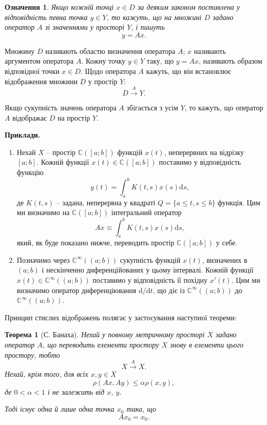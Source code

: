 \documentclass[14pt,twoside]{extreport}
\theoremstyle{mystyle}
\newtheorem{dfn}{Означення}
\newtheorem{thm}{Теорема}
\numberwithin{equation}{chapter}
\newcommand{\cab}{\mathbb{C}([a; b])}
\begin{document}
\begin{dfn}
 Якщо кожній точці $x\in D$ за деяким законом поставлена у відповідність певна точка $y\in Y$, то кажуть, що на множині $D$ задано оператор $A$ зі значеннями у просторі $Y$, і пишуть
 \[
  y=Ax.
 \]
\end{dfn}

Множину $D$ називають областю визначення оператора $A$; $x$ називають аргументом оператора $A$. Кожну точку $y \in Y$ таку, що $y = Ax$, називають образом відповідної точки $x\in D$. Щодо оператора $A$ кажуть, що він встановлює відображення множини $D$ у простір $Y$:
\[
 D\xrightarrow{A}Y.
\]

Якщо сукупність значень оператора $A$ збігається з усім $Y$, то кажуть, що оператор $A$ відображає $D$ на простір $Y$.

\textbf{Приклади.}
\begin{enumerate}
 \item Нехай $X$ -- простір $\cab$ функцій $x(t)$, неперервних на відрізку $[a; b]$. Кожній функції $x(t) \in \cab$ поставимо у відповідність функцію
 \[
  y(t)=\int_{a}^{b}K(t, s) x(s) \mathrm{d}s,
 \]
 де $K(t, s)$ -- задана, неперервна у квадраті $Q=\{a \leqslant t,s \leqslant b\}$ функція. Цим ми визначимо на $\cab$ інтегральний оператор
 \[
  Ax\equiv \int_{a}^{b}K(t, s) x(s) \mathrm{d}s,
 \]
 який, як буде показано нижче, переводить простір $\cab$ у себе.
 \item Позначимо через $\mathbb{C}^{\infty}((a; b))$ сукупність функцій $x(t)$, визначених в $(a; b)$ і нескінченно диференційованих у цьому інтервалі. Кожній функції $x(t) \in \mathbb{C}^{\infty}((a; b))$ поставимо у відповідність її похідну $x'(t)$. Цим ми визначимо оператор диференціювання $\mathrm{d}/\mathrm{d}t$, що діє із $\mathbb{C}^{\infty}((a; b))$ до $\mathbb{C}^{\infty}((a; b))$.
\end{enumerate}

Принцип стислих відображень полягає у застосування наступної теореми:

\begin{thm}[С. Банаха]\label{TBanach}
 Нехай у повному метричному просторі $X$ задано оператор $A$, що переводить елементи простору $X$ знову в елементи цього простору, тобто
\[
 X \xrightarrow{A}X.
\]
 Нехай, крім того, для всіх $x, y \in X$
\begin{equation}\label{contraction}
 \rho(Ax, Ay) \leqslant \alpha \rho(x, y),
\end{equation}
де $0 < \alpha < 1$ і не залежить від $x$, $y$.

Тоді існує одна й лише одна точка $x_0$ така, що
\[
 Ax_0 = x_0.
\]
\end{thm}
\end{document}
